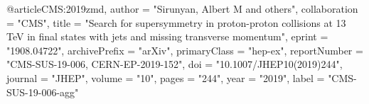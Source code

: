 @article{CMS:2019zmd,
    author = "Sirunyan, Albert M and others",
    collaboration = "CMS",
    title = "{Search for supersymmetry in proton-proton collisions at 13 TeV in final states with jets and missing transverse momentum}",
    eprint = "1908.04722",
    archivePrefix = "arXiv",
    primaryClass = "hep-ex",
    reportNumber = "CMS-SUS-19-006, CERN-EP-2019-152",
    doi = "10.1007/JHEP10(2019)244",
    journal = "JHEP",
    volume = "10",
    pages = "244",
    year = "2019",
    label = "CMS-SUS-19-006-agg"
}

